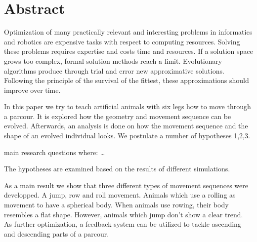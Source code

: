 %
%


\chapter{Abstract}

  Optimization of many practically relevant and
  interesting problems in informatics and robotics are expensive tasks with respect to computing resources.
  Solving these problems requires expertise and costs time and resources.
  If a solution space grows too complex, formal solution methods reach a limit.
  Evolutionary algorithms produce through trial and error new approximative solutions.
  Following the principle of the survival of the fittest, these approximations should improve over time.

  \smallskip

  In this paper we try to teach artificial animals with six legs how to move through a parcour.
  It is explored how the geometry and movement sequence can be evolved.
  Afterwards, an analysis is done on how the movement sequence and the shape of an evolved individual looks.
  We postulate a number of hypotheses 1,2,3. %

  main research questions where: \ldots

  The hypotheses are examined based on the results of different simulations.

  \smallskip

  As a main result we show that three different types of movement sequences were developped.
  A jump, row and roll movement. Animals which use a rolling as movement to have a spherical body.
  When animals use rowing, their body resembles a flat shape. However, animals which jump don't show a clear trend.
  As further optimization, a feedback system can be utilized to tackle ascending and descending parts of a parcour.
